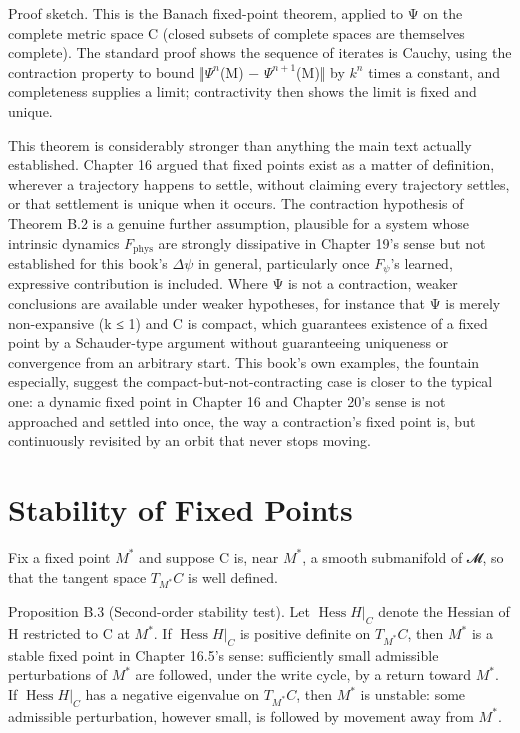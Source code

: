Proof sketch. This is the Banach fixed-point theorem, applied to Ψ on the complete metric space C (closed subsets of complete spaces are themselves complete). The standard proof shows the sequence of iterates is Cauchy, using the contraction property to bound ‖\(\Psi^n\)(M) − \(\Psi^{n+1}\)(M)‖ by \(k^n\) times a constant, and completeness supplies a limit; contractivity then shows the limit is fixed and unique.

This theorem is considerably stronger than anything the main text actually established. Chapter 16 argued that fixed points exist as a matter of definition, wherever a trajectory happens to settle, without claiming every trajectory settles, or that settlement is unique when it occurs. The contraction hypothesis of Theorem B.2 is a genuine further assumption, plausible for a system whose intrinsic dynamics \(F_{\mathrm{phys}}\) are strongly dissipative in Chapter 19's sense but not established for this book's \(\Delta\psi\) in general, particularly once \(F_\psi\)'s learned, expressive contribution is included. Where Ψ is not a contraction, weaker conclusions are available under weaker hypotheses, for instance that Ψ is merely non-expansive (k ≤ 1) and C is compact, which guarantees existence of a fixed point by a Schauder-type argument without guaranteeing uniqueness or convergence from an arbitrary start. This book's own examples, the fountain especially, suggest the compact-but-not-contracting case is closer to the typical one: a dynamic fixed point in Chapter 16 and Chapter 20's sense is not approached and settled into once, the way a contraction's fixed point is, but continuously revisited by an orbit that never stops moving.

\section{Stability of Fixed Points}

Fix a fixed point \(M^*\) and suppose C is, near \(M^*\), a smooth submanifold of 𝓜, so that the tangent space \(T_{M^*}C\) is well defined.

Proposition B.3 (Second-order stability test). Let \(\operatorname{Hess}H|_C\) denote the Hessian of H restricted to C at \(M^*\). If \(\operatorname{Hess}H|_C\) is positive definite on \(T_{M^*}C\), then \(M^*\) is a stable fixed point in Chapter 16.5's sense: sufficiently small admissible perturbations of \(M^*\) are followed, under the write cycle, by a return toward \(M^*\). If \(\operatorname{Hess}H|_C\) has a negative eigenvalue on \(T_{M^*}C\), then \(M^*\) is unstable: some admissible perturbation, however small, is followed by movement away from \(M^*\).

